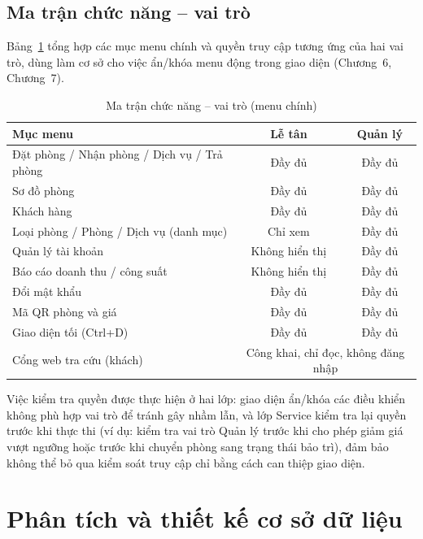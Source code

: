 \documentclass[14pt]{report}
\begin{document}
\section{Ma trận chức năng -- vai trò}
\label{sec:ma-tran}

Bảng~\ref{tab:ma-tran-menu} tổng hợp các mục menu chính và quyền truy cập tương ứng của hai vai trò, dùng làm cơ sở cho việc ẩn/khóa menu động trong giao diện (Chương~6, Chương~7).

\begin{table}[H]
\centering
\caption{Ma trận chức năng -- vai trò (menu chính)}
\label{tab:ma-tran-menu}
\begin{tabularx}{\textwidth}{|X|c|c|}
\hline
\textbf{Mục menu} & \textbf{Lễ tân} & \textbf{Quản lý} \\\hline
Đặt phòng / Nhận phòng / Dịch vụ / Trả phòng & Đầy đủ & Đầy đủ \\\hline
Sơ đồ phòng & Đầy đủ & Đầy đủ \\\hline
Khách hàng & Đầy đủ & Đầy đủ \\\hline
Loại phòng / Phòng / Dịch vụ (danh mục) & Chỉ xem & Đầy đủ \\\hline
Quản lý tài khoản & Không hiển thị & Đầy đủ \\\hline
Báo cáo doanh thu / công suất & Không hiển thị & Đầy đủ \\\hline
Đổi mật khẩu & Đầy đủ & Đầy đủ \\\hline
Mã QR phòng và giá & Đầy đủ & Đầy đủ \\\hline
Giao diện tối (Ctrl+D) & Đầy đủ & Đầy đủ \\\hline
Cổng web tra cứu (khách) & \multicolumn{2}{c|}{Công khai, chỉ đọc, không đăng nhập} \\\hline
\end{tabularx}
\end{table}

Việc kiểm tra quyền được thực hiện ở hai lớp: giao diện ẩn/khóa các điều khiển không phù hợp vai trò để tránh gây nhầm lẫn, và lớp Service kiểm tra lại quyền trước khi thực thi (ví dụ: kiểm tra vai trò Quản lý trước khi cho phép giảm giá vượt ngưỡng hoặc trước khi chuyển phòng sang trạng thái bảo trì), đảm bảo không thể bỏ qua kiểm soát truy cập chỉ bằng cách can thiệp giao diện.


\chapter{Phân tích và thiết kế cơ sở dữ liệu}
\end{document}
